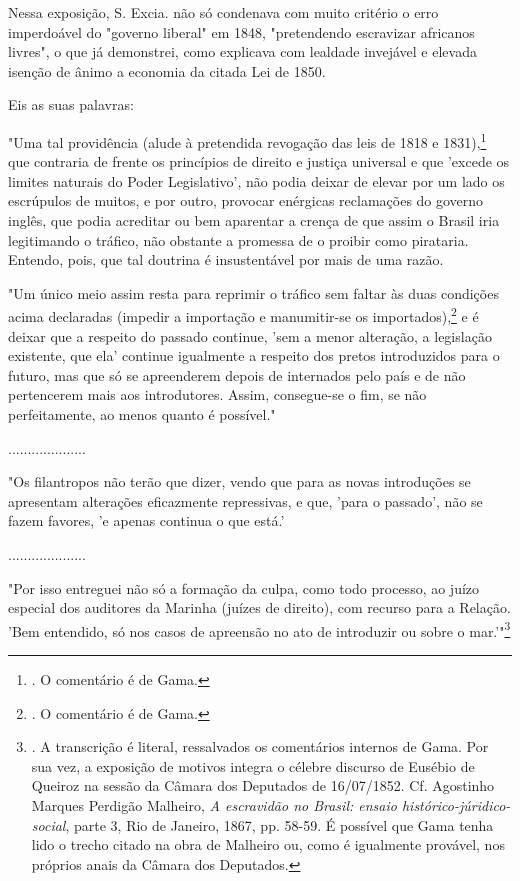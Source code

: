 Nessa exposição, S. Excia. não só condenava com muito critério o erro
imperdoável do "governo liberal" em 1848, "pretendendo escravizar
africanos livres", o que já demonstrei, como explicava com lealdade
invejável e elevada isenção de ânimo a economia da citada Lei de 1850.

Eis as suas palavras:

"Uma tal providência (alude à pretendida revogação das leis de 1818 e
1831),\footnote{. O comentário é de Gama.} que contraria de frente os
princípios de direito e justiça universal e que 'excede os limites
naturais do Poder Legislativo', não podia deixar de elevar por um lado
os escrúpulos de muitos, e por outro, provocar enérgicas reclamações do
governo inglês, que podia acreditar ou bem aparentar a crença de que
assim o Brasil iria legitimando o tráfico, não obstante a promessa de o
proibir como pirataria. Entendo, pois, que tal doutrina é insustentável
por mais de uma razão.

"Um único meio assim resta para reprimir o tráfico sem faltar às duas
condições acima declaradas (impedir a importação e manumitir-se os
importados),\footnote{. O comentário é de Gama.} e é deixar que a
respeito do passado continue, 'sem a menor alteração, a legislação
existente, que ela' continue igualmente a respeito dos pretos
introduzidos para o futuro, mas que só se apreenderem depois de
internados pelo país e de não pertencerem mais aos introdutores. Assim,
consegue-se o fim, se não perfeitamente, ao menos quanto é possível."

....................

"Os filantropos não terão que dizer, vendo que para as novas introduções
se apresentam alterações eficazmente repressivas, e que, 'para o
passado', não se fazem favores, 'e apenas continua o que está.'

....................

"Por isso entreguei não só a formação da culpa, como todo processo, ao
juízo especial dos auditores da Marinha (juízes de direito), com recurso
para a Relação. 'Bem entendido, só nos casos de apreensão no ato de
introduzir ou sobre o mar.'"\footnote{. A transcrição é literal,
  ressalvados os comentários internos de Gama. Por sua vez, a exposição
  de motivos integra o célebre discurso de Eusébio de Queiroz na sessão
  da Câmara dos Deputados de 16/07/1852. Cf. Agostinho Marques Perdigão
  Malheiro, \emph{A escravidão no Brasil: ensaio
  histórico-júridico-social}, parte 3, Rio de Janeiro, 1867, pp. 58-59.
  É possível que Gama tenha lido o trecho citado na obra de Malheiro ou,
  como é igualmente provável, nos próprios anais da Câmara dos
  Deputados.}


